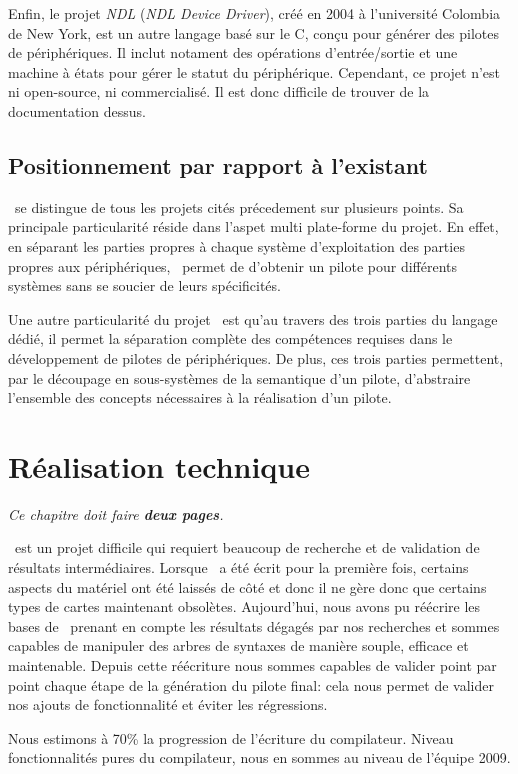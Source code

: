 \documentclass[francais]{rtxreport}
\begin{document}
Enfin, le projet \emph{NDL} (\emph{NDL Device Driver}), créé en 2004 à
l'université Colombia de New York, est un autre langage basé sur le C, conçu
pour générer des pilotes de périphériques. Il inclut notament des opérations
d'entrée/sortie et une machine à états pour gérer le statut du
périphérique. Cependant, ce projet n'est ni open-source, ni commercialisé. Il
est donc difficile de trouver de la documentation dessus.

\section{Positionnement par rapport à l'existant}
\rtx\ se distingue de tous les projets cités précedement sur plusieurs
points. Sa principale particularité réside dans l'aspet multi plate-forme du
projet. En effet, en séparant les parties propres à chaque système
d'exploitation des parties propres aux périphériques, \rtx\ permet de d'obtenir
un pilote pour différents systèmes sans se soucier de leurs spécificités.

Une autre particularité du projet \rtx\ est qu'au travers des trois parties du
langage dédié, il permet la séparation complète des compétences requises dans le
développement de pilotes de périphériques. De plus, ces trois parties
permettent, par le découpage en sous-systèmes de la semantique d'un pilote,
d'abstraire l'ensemble des concepts nécessaires à la réalisation d'un pilote.

\chapter{Réalisation technique}

\emph{Ce chapitre doit faire \textbf{deux pages}.}

\rtx\ est un projet difficile qui requiert beaucoup de recherche et de
validation de résultats intermédiaires. Lorsque \rtx\ a été écrit pour la
première fois, certains aspects du matériel ont été laissés de côté et donc il
ne gère donc que certains types de cartes maintenant obsolètes. Aujourd'hui,
nous avons pu réécrire les bases de \rtx\ prenant en compte les résultats
dégagés par nos recherches et sommes capables de manipuler des arbres de
syntaxes de manière souple, efficace et maintenable. Depuis cette réécriture
nous sommes capables de valider point par point chaque étape de la génération du
pilote final: cela nous permet de valider nos ajouts de fonctionnalité et éviter
les régressions.

Nous estimons à 70\% la progression de l’écriture du compilateur. Niveau
fonctionnalités pures du compilateur, nous en sommes au niveau de l'équipe 2009.
\end{document}
